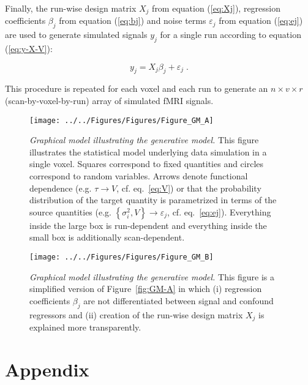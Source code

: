 \documentclass[a4paper,12pt]{article}
\begin{document}
Finally, the run-wise design matrix $X_j$ from equation (\ref{eq:Xj}), regression coefficients $\beta_j$ from equation (\ref{eq:bj}) and noise terms $\varepsilon_j$ from equation (\ref{eq:ej}) are used to generate simulated signals $y_j$ for a single run according to equation (\ref{eq:y-X-V}):

\begin{equation} \label{eq:yj}
y_j = X_j \beta_j + \varepsilon_j \; .
\end{equation}

This procedure is repeated for each voxel and each run to generate an $n \times v \times r$ (scan-by-voxel-by-run) array of simulated fMRI signals.

\begin{figure}
	\begin{center}
		\texttt{[image: ../../Figures/Figures/Figure\_GM\_A]}
	\end{center}
	\vspace{-1em}
	\caption{\textit{Graphical model illustrating the generative model.} This figure illustrates the statistical model underlying data simulation in a single voxel. Squares correspond to fixed quantities and circles correspond to random variables. Arrows denote functional dependence (e.g. $\tau \rightarrow V$, cf. eq.~\ref{eq:V}) or that the probability distribution of the target quantity is parametrized in terms of the source quantities (e.g. $\left\lbrace \sigma_i^2, V \right\rbrace \rightarrow \varepsilon_j$, cf. eq.~\ref{eq:ej}). Everything inside the large box is run-dependent and everything inside the small box is additionally scan-dependent.} \label{fig:GM-A}
	\begin{center}
		\texttt{[image: ../../Figures/Figures/Figure\_GM\_B]}
	\end{center}
	\vspace{-1em}
	\caption{\textit{Graphical model illustrating the generative model.} This figure is a simplified version of Figure~\ref{fig:GM-A} in which (i) regression coefficients $\beta_j$ are not differentiated between signal and confound regressors and (ii) creation of the run-wise design matrix $X_j$ is explained more transparently.} \label{fig:GM-B}
\end{figure}


\pagebreak
\section{Appendix} \label{sec:Appendix}
\renewcommand\thesubsection{\Alph{subsection}}
\renewcommand\theequation{\thesubsection.\arabic{equation}}
\end{document}

